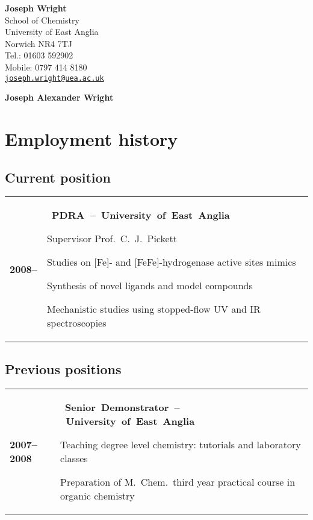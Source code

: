 \documentclass[11pt]{article}
\makeatletter
\newlength{\sidewidth}
\newlength{\mainwidth}
\newcommand*{\headline}[1]
  {%
    \hbox{%
      \llap{\ding{72}\hspace*{0.2 em}}%
      \textbf{#1}%
    }%
  }
\newenvironment{CVtable}
  {%
    \begin{tabular}
      {@{}>{\bfseries}p{\sidewidth}@{}>{\RaggedRight}p{\mainwidth}@{}}%
  }
  {\end{tabular}}
\makeatother
\begin{document}
\begin{raggedleft}
  \textbf{Joseph Wright}    \\
  School of Chemistry       \\
  University of East Anglia \\
  Norwich NR4 7TJ           \\
  Tel.: 01603 592902        \\
  Mobile: 0797 414 8180     \\
  \href{mailto:joseph.wright@uea.ac.uk}
    {\texttt{joseph.wright@uea.ac.uk}} \\
\end{raggedleft}

\begin{center}
  \Huge\bfseries\sffamily
  Joseph Alexander Wright
\end{center}

\section{Employment history}

\subsection{Current position}

\begin{CVtable}
  2008-- &
    \headline{PDRA -- University of East Anglia} \par
    Supervisor Prof.~C.~J.~Pickett \par
    Studies on [Fe]- and [FeFe]-hydrogenase active sites mimics \par
    Synthesis of novel ligands and model compounds \par
    Mechanistic studies using stopped-flow UV and IR spectroscopies
  \\
\end{CVtable}

\subsection{Previous positions}

\begin{CVtable}
  2007--2008 &
    \headline{Senior Demonstrator -- University of East Anglia} \par
    Teaching degree level chemistry:
    tutorials and laboratory classes \par
    Preparation of M.~Chem.~third year practical course in
    organic chemistry
\end{CVtable}
\end{document}
